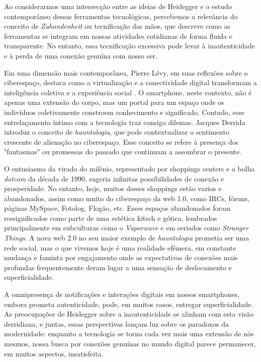 Ao considerarmos uma intersecção entre as ideias de Heidegger e o estudo contemporâneo dessas ferramentas tecnológicas, percebemos a relevância do conceito de \textit{Zuhandenheit} ou tecnificação das mãos, que descreve como as ferramentas se integram em nossas atividades cotidianas de forma fluida e transparente. No entanto, essa tecnificação excessiva pode levar à inautenticidade e à perda de uma conexão genuína com nosso ser.

Em uma dimensão mais contemporânea, Pierre Lévy, em suas reflexões sobre o ciberespaço, destaca como a virtualização e a conectividade digital transformam a inteligência coletiva e a experiência social \cite{2010_Levy_BOOK}. O smartphone, neste contexto, não é apenas uma extensão do corpo, mas um portal para um espaço onde os indivíduos coletivamente constroem conhecimento e significado. Contudo, esse entrelaçamento íntimo com a tecnologia traz consigo dilemas. Jacques Derrida introduz o conceito de \textit{hauntologia}, que pode contextualizar o sentimento crescente de alienação no ciberespaço. Esse conceito se refere à presença dos "fantasmas" ou promessas do passado que continuam a assombrar o presente. 

O entusiasmo da virada do milênio, representado por shoppings centers e a bolha \textit{dotcom} da década de 1990, sugeria infinitas possibilidades de conexão e prosperidade. No entanto, hoje, muitos desses shoppings estão vazios e abandonados, assim como muito do ciberespaço da web 1.0, como IRCs, fóruns, páginas MySpace, Fotolog, Flogão, etc. Esses espaços abandonados foram ressignificados como parte de uma estética kitsch e gótica, lembrados principalmente em subculturas como o \textit{Vaporwave} e em seriados como \textit{Stranger Things}. A nova web 2.0 no seu maior exemplo de \textit{hauntologia} prometia ser uma rede social, mas o que vivemos hoje é uma realidade efêmera, em constante mudança e faminta por engajamento onde as expectativas de conexões mais profundas frequentemente deram lugar a uma sensação de deslocamento e superficialidade.

A omnipresença de notificações e interações digitais em nossos smartphones, embora prometa autenticidade, pode, em muitos casos, entregar superficialidade. As preocupações de Heidegger sobre a inautenticidade se alinham com esta visão derridiana, e juntas, essas perspectivas lançam luz sobre os paradoxos da modernidade: enquanto a tecnologia se torna cada vez mais uma extensão de nós mesmos, nossa busca por conexões genuínas no mundo digital parece permanecer, em muitos aspectos, insatisfeita.

